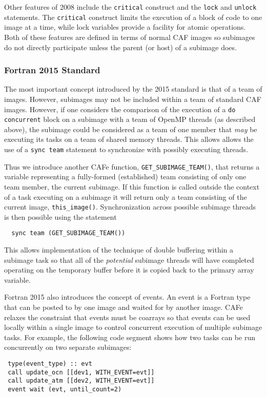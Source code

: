 Other features of 2008 include the \texttt{critical} construct and the \texttt{lock} and
\texttt{unlock} statements.  The \texttt{critical} construct limits the execution of a
block of code to one image at a time, while lock variables provide a facility for atomic
operations.  Both of these features are defined in terms of normal CAF images so subimages
do not directly participate unless the parent (or host) of a subimage does.

\subsubsection{Fortran 2015 Standard}

The most important concept introduced by the 2015 standard is that of a team of images.
However, subimages may not be included within a team of standard CAF images.  However, if one
considers the comparison of the execution of a \texttt{do concurrent} block on a subimage
with a team of OpenMP threads (as described above), the subimage could be considered as
a team of one member that \emph{may} be executing its tasks on a team of shared memory threads.
This allows allows the use of a \texttt{sync team} statement to synchronize with
possibly executing threads.

Thus we introduce another CAFe function, \texttt{GET\_SUBIMAGE\_TEAM()}, that returns a
variable representing a fully-formed (established) team consisting of only one team
member, the current subimage.  If this function is called outside the context of a task
executing on a subimage it will return only a team consisting of the current image,
\texttt{this\_image()}.  Synchronization across possible subimage threads is then possible
using the statement
\begin{verbatim}
  sync team (GET_SUBIMAGE_TEAM())
\end{verbatim}
This allows implementation of the technique of double buffering within a subimage task
so that all of the \emph{potential} subimage threads will have completed operating on the
temporary buffer before it is copied back to the primary array variable.

Fortran 2015 also introduces the concept of events.  An event is a Fortran type that
can be posted to by one image and waited for by another image.  CAFe relaxes the
constraint that events must be coarrays so that events can be used locally within
a single image to control concurrent execution of multiple subimage tasks.  For example,
the following code segment shows how two tasks can be run concurrently on two separate
subimages:
\begin{verbatim}
 type(event_type) :: evt
 call update_ocn [[dev1, WITH_EVENT=evt]]
 call update_atm [[dev2, WITH_EVENT=evt]]
 event wait (evt, until_count=2)
\end{verbatim}

